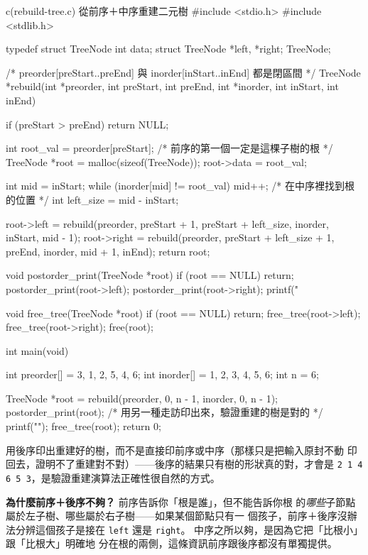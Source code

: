 \begin{example}{c}{(rebuild-tree.c) 從前序＋中序重建二元樹}
#include <stdio.h>
#include <stdlib.h>

typedef struct TreeNode {
    int data;
    struct TreeNode *left, *right;
} TreeNode;

/* preorder[preStart..preEnd] 與 inorder[inStart..inEnd] 都是閉區間 */
TreeNode *rebuild(int *preorder, int preStart, int preEnd,
                   int *inorder, int inStart, int inEnd) {
    if (preStart > preEnd) return NULL;

    int root_val = preorder[preStart]; /* 前序的第一個一定是這棵子樹的根 */
    TreeNode *root = malloc(sizeof(TreeNode));
    root->data = root_val;

    int mid = inStart;
    while (inorder[mid] != root_val) mid++; /* 在中序裡找到根的位置 */
    int left_size = mid - inStart;

    root->left = rebuild(preorder, preStart + 1, preStart + left_size,
                          inorder, inStart, mid - 1);
    root->right = rebuild(preorder, preStart + left_size + 1, preEnd,
                           inorder, mid + 1, inEnd);
    return root;
}

void postorder_print(TreeNode *root) {
    if (root == NULL) return;
    postorder_print(root->left);
    postorder_print(root->right);
    printf("%
}

void free_tree(TreeNode *root) {
    if (root == NULL) return;
    free_tree(root->left);
    free_tree(root->right);
    free(root);
}

int main(void) {
    int preorder[] = {3, 1, 2, 5, 4, 6};
    int inorder[]  = {1, 2, 3, 4, 5, 6};
    int n = 6;

    TreeNode *root = rebuild(preorder, 0, n - 1, inorder, 0, n - 1);
    postorder_print(root); /* 用另一種走訪印出來，驗證重建的樹是對的 */
    printf("\n");
    free_tree(root);
    return 0;
}
\end{example}


用後序印出重建好的樹，而不是直接印前序或中序（那樣只是把輸入原封不動
印回去，證明不了重建對不對）——後序的結果只有樹的形狀真的對，才會是
\texttt{2 1 4 6 5 3}，是驗證重建演算法正確性很自然的方式。

\textbf{為什麼前序＋後序不夠？} 前序告訴你「根是誰」，但不能告訴你根
的\textit{哪些}子節點屬於左子樹、哪些屬於右子樹——如果某個節點只有一
個孩子，前序＋後序沒辦法分辨這個孩子是接在 \texttt{left} 還是
\texttt{right}。 中序之所以夠，是因為它把「比根小」跟「比根大」明確地
分在根的兩側，這條資訊前序跟後序都沒有單獨提供。


